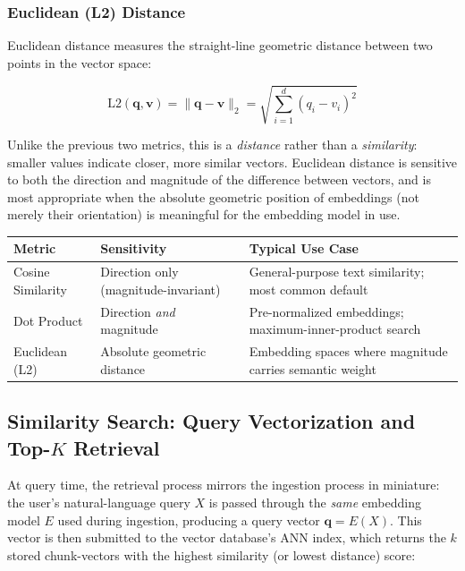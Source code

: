 \documentclass[11pt,a4paper]{article}
\begin{document}
\subsubsection{Euclidean (L2) Distance}

Euclidean distance measures the straight-line geometric distance between two points in the vector space:

\begin{equation}
\text{L2}(\mathbf{q}, \mathbf{v}) = \lVert \mathbf{q} - \mathbf{v} \rVert_2 = \sqrt{\sum_{i=1}^{d} (q_i - v_i)^2}
\end{equation}

Unlike the previous two metrics, this is a \emph{distance} rather than a \emph{similarity}: smaller values indicate closer, more similar vectors. Euclidean distance is sensitive to both the direction and magnitude of the difference between vectors, and is most appropriate when the absolute geometric position of embeddings (not merely their orientation) is meaningful for the embedding model in use.

\begin{center}
\begin{tabular}{@{}p{3.2cm}p{5.4cm}p{5.8cm}@{}}
\toprule
\textbf{Metric} & \textbf{Sensitivity} & \textbf{Typical Use Case} \\
\midrule
Cosine Similarity & Direction only (magnitude-invariant) & General-purpose text similarity; most common default \\
Dot Product & Direction \emph{and} magnitude & Pre-normalized embeddings; maximum-inner-product search \\
Euclidean (L2) & Absolute geometric distance & Embedding spaces where magnitude carries semantic weight \\
\bottomrule
\end{tabular}
\end{center}

\subsection{Similarity Search: Query Vectorization and Top-\texorpdfstring{$K$}{K} Retrieval}

At query time, the retrieval process mirrors the ingestion process in miniature: the user's natural-language query $X$ is passed through the \emph{same} embedding model $E$ used during ingestion, producing a query vector $\mathbf{q} = E(X)$. This vector is then submitted to the vector database's ANN index, which returns the $k$ stored chunk-vectors with the highest similarity (or lowest distance) score:
\end{document}
